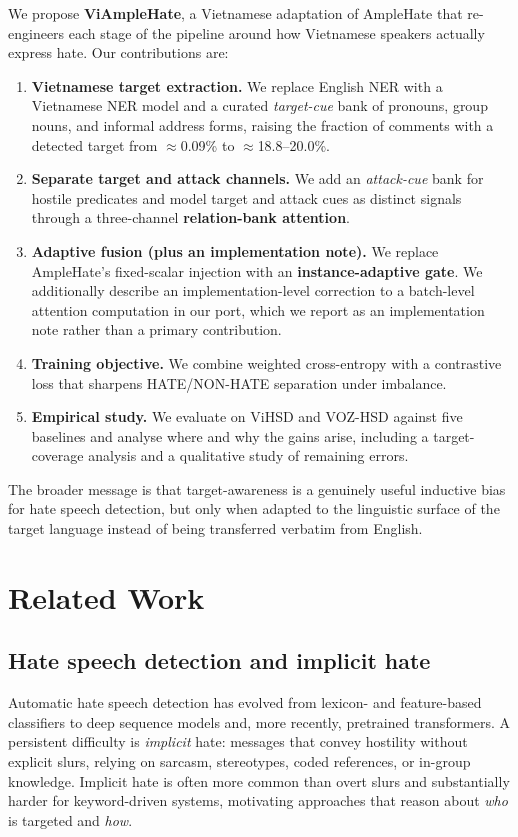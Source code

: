 \documentclass[11pt]{article}
\begin{document}
We propose \textbf{ViAmpleHate}, a Vietnamese adaptation of AmpleHate that re-engineers each stage of the pipeline around how Vietnamese speakers actually express hate. Our contributions are:
\begin{enumerate}
  \item \textbf{Vietnamese target extraction.} We replace English NER with a Vietnamese NER model and a curated \emph{target-cue} bank of pronouns, group nouns, and informal address forms, raising the fraction of comments with a detected target from $\approx$0.09\% to $\approx$18.8--20.0\%.
  \item \textbf{Separate target and attack channels.} We add an \emph{attack-cue} bank for hostile predicates and model target and attack cues as distinct signals through a three-channel \textbf{relation-bank attention}.
  \item \textbf{Adaptive fusion (plus an implementation note).} We replace AmpleHate's fixed-scalar injection with an \textbf{instance-adaptive gate}. We additionally describe an implementation-level correction to a batch-level attention computation in our port, which we report as an implementation note rather than a primary contribution.
  \item \textbf{Training objective.} We combine weighted cross-entropy with a contrastive loss that sharpens HATE/NON-HATE separation under imbalance.
  \item \textbf{Empirical study.} We evaluate on ViHSD and VOZ-HSD against five baselines and analyse where and why the gains arise, including a target-coverage analysis and a qualitative study of remaining errors.
\end{enumerate}
The broader message is that target-awareness is a genuinely useful inductive bias for hate speech detection, but only when adapted to the linguistic surface of the target language instead of being transferred verbatim from English.

\section{Related Work}

\subsection{Hate speech detection and implicit hate}
Automatic hate speech detection has evolved from lexicon- and feature-based classifiers to deep sequence models and, more recently, pretrained transformers. A persistent difficulty is \emph{implicit} hate: messages that convey hostility without explicit slurs, relying on sarcasm, stereotypes, coded references, or in-group knowledge. Implicit hate is often more common than overt slurs and substantially harder for keyword-driven systems, motivating approaches that reason about \emph{who} is targeted and \emph{how}.
\end{document}
